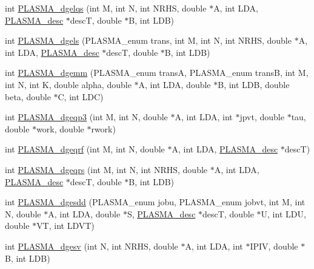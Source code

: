 \begin{DoxyCompactItemize}
\item 
int \hyperlink{group__double_ga092545f106c9fae67b82eb65f11ca4ab_ga092545f106c9fae67b82eb65f11ca4ab}{P\+L\+A\+S\+M\+A\+\_\+dgelqs} (int M, int N, int N\+R\+H\+S, double $\ast$A, int L\+D\+A, \hyperlink{structplasma__desc__t}{P\+L\+A\+S\+M\+A\+\_\+desc} $\ast$desc\+T, double $\ast$B, int L\+D\+B)
\item 
int \hyperlink{group__double_ga4bfc0cdaf567c26828f484e54d457d92_ga4bfc0cdaf567c26828f484e54d457d92}{P\+L\+A\+S\+M\+A\+\_\+dgels} (P\+L\+A\+S\+M\+A\+\_\+enum trans, int M, int N, int N\+R\+H\+S, double $\ast$A, int L\+D\+A, \hyperlink{structplasma__desc__t}{P\+L\+A\+S\+M\+A\+\_\+desc} $\ast$desc\+T, double $\ast$B, int L\+D\+B)
\item 
int \hyperlink{group__double_ga5c560bea8139857be91339582ba830ef_ga5c560bea8139857be91339582ba830ef}{P\+L\+A\+S\+M\+A\+\_\+dgemm} (P\+L\+A\+S\+M\+A\+\_\+enum trans\+A, P\+L\+A\+S\+M\+A\+\_\+enum trans\+B, int M, int N, int K, double alpha, double $\ast$A, int L\+D\+A, double $\ast$B, int L\+D\+B, double beta, double $\ast$C, int L\+D\+C)
\item 
int \hyperlink{group__double_ga9d11b150328fa64daa7c9f798baf3ea1_ga9d11b150328fa64daa7c9f798baf3ea1}{P\+L\+A\+S\+M\+A\+\_\+dgeqp3} (int M, int N, double $\ast$A, int L\+D\+A, int $\ast$jpvt, double $\ast$tau, double $\ast$work, double $\ast$rwork)
\item 
int \hyperlink{group__double_gaad8136b3520b4bda7261d3f921c8a740_gaad8136b3520b4bda7261d3f921c8a740}{P\+L\+A\+S\+M\+A\+\_\+dgeqrf} (int M, int N, double $\ast$A, int L\+D\+A, \hyperlink{structplasma__desc__t}{P\+L\+A\+S\+M\+A\+\_\+desc} $\ast$desc\+T)
\item 
int \hyperlink{group__double_gaa133b69ef592ef01466fd93b6ac7689d_gaa133b69ef592ef01466fd93b6ac7689d}{P\+L\+A\+S\+M\+A\+\_\+dgeqrs} (int M, int N, int N\+R\+H\+S, double $\ast$A, int L\+D\+A, \hyperlink{structplasma__desc__t}{P\+L\+A\+S\+M\+A\+\_\+desc} $\ast$desc\+T, double $\ast$B, int L\+D\+B)
\item 
int \hyperlink{group__double_ga90d8245b7c9b7124c35c485f0e4f63b7_ga90d8245b7c9b7124c35c485f0e4f63b7}{P\+L\+A\+S\+M\+A\+\_\+dgesdd} (P\+L\+A\+S\+M\+A\+\_\+enum jobu, P\+L\+A\+S\+M\+A\+\_\+enum jobvt, int M, int N, double $\ast$A, int L\+D\+A, double $\ast$S, \hyperlink{structplasma__desc__t}{P\+L\+A\+S\+M\+A\+\_\+desc} $\ast$desc\+T, double $\ast$U, int L\+D\+U, double $\ast$V\+T, int L\+D\+V\+T)
\item 
int \hyperlink{group__double_gae380e95b53e07b9b1261aec244191c0f_gae380e95b53e07b9b1261aec244191c0f}{P\+L\+A\+S\+M\+A\+\_\+dgesv} (int N, int N\+R\+H\+S, double $\ast$A, int L\+D\+A, int $\ast$I\+P\+I\+V, double $\ast$B, int L\+D\+B)

\end{DoxyCompactItemize}
